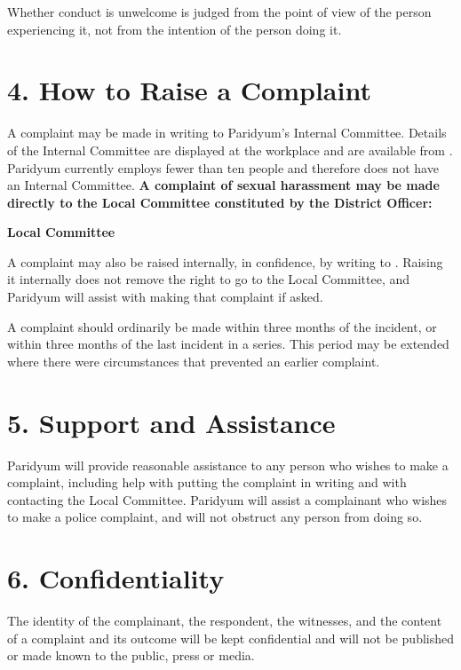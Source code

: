 \documentclass{paridyum}
\begin{document}
Whether conduct is unwelcome is judged from the point of view of the person
experiencing it, not from the intention of the person doing it.

\section*{4. How to Raise a Complaint}
\ifdkOrgPoshInternalCommittee
A complaint may be made in writing to Paridyum's Internal Committee. Details of the
Internal Committee are displayed at the workplace and are available from
\dkOrgPoshContactEmail.
\else
Paridyum currently employs fewer than ten people and therefore does not have an
Internal Committee. \textbf{A complaint of sexual harassment may be made directly to
the Local Committee constituted by the District Officer:}

\vspace{0.5em}
\begin{infobox}
\textbf{Local Committee}\\[0.4em]
\dkOrgPoshLocalCommittee

\vspace{0.5em}
A complaint may also be raised internally, in confidence, by writing to
\textbf{\dkOrgPoshContactEmail}. Raising it internally does not remove the right to
go to the Local Committee, and Paridyum will assist with making that complaint if
asked.
\end{infobox}
\fi

\vspace{0.5em}
A complaint should ordinarily be made within three months of the incident, or within
three months of the last incident in a series. This period may be extended where there
were circumstances that prevented an earlier complaint.

\section*{5. Support and Assistance}
Paridyum will provide reasonable assistance to any person who wishes to make a
complaint, including help with putting the complaint in writing and with contacting
the Local Committee. Paridyum will assist a complainant who wishes to make a police
complaint, and will not obstruct any person from doing so.

\section*{6. Confidentiality}
The identity of the complainant, the respondent, the witnesses, and the content of a
complaint and its outcome will be kept confidential and will not be published or made
known to the public, press or media.
\end{document}
